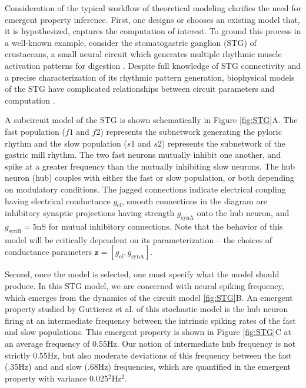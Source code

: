 \documentclass[11pt]{article}
\begin{document}
Consideration of the typical workflow of theoretical modeling clarifies the need for emergent property inference.  
First, one designs or chooses an existing model that, it is hypothesized, captures the computation of interest. 
To ground this process in a well-known example, consider the stomatogastric ganglion (STG) of crustaceans, a small neural circuit which generates multiple rhythmic muscle activation patterns for digestion \cite{marder2002cellular}.
Despite full knowledge of STG connectivity and a precise characterization of its rhythmic pattern generation, biophysical models of the STG have complicated relationships between circuit parameters and computation \cite{goldman2001global, prinz2004similar}.

A subcircuit model of the STG \cite{gutierrez2013multiple} is shown schematically in Figure \ref{fig:STG}A.
The fast population ($f1$ and $f2$) represents the subnetwork generating the pyloric rhythm and the slow population ($s1$ and $s2$) represents the subnetwork of the gastric mill rhythm.
The two fast neurons mutually inhibit one another, and spike at a greater frequency than the mutually inhibiting slow neurons.
The hub neuron (hub) couples with either the fast or slow population, or both depending on modulatory conditions.
The jagged connections indicate electrical coupling having electrical conductance $g_{\text{el}}$, smooth connections in the diagram are inhibitory synaptic projections having strength $g_{\text{synA}}$ onto the hub neuron, and $g_{\text{synB}}=5$nS for mutual inhibitory connections.
Note that the behavior of this model will be critically dependent on its parameterization -- the choices of conductance parameters $\mathbf{z} = [g_{\text{el}}, g_{\text{synA}}]$.

Second, once the model is selected, one must specify what the model should produce.
In this STG model, we are concerned with neural spiking frequency, which emerges from the dynamics of the circuit model \ref{fig:STG}B.
An emergent property studied by Guttierez et al. of this stochastic model is the hub neuron firing at an intermediate frequency between the intrinsic spiking rates of the fast and slow populations.
This emergent property is shown in Figure \ref{fig:STG}C at an average frequency of 0.55Hz.
Our notion of intermediate hub frequency is not strictly 0.55Hz, but also moderate deviations of this frequency between the fast (.35Hz) and and slow (.68Hz) frequencies, which are quantified in the emergent property with variance {0.025$^2$Hz$^2$}.
\end{document}
